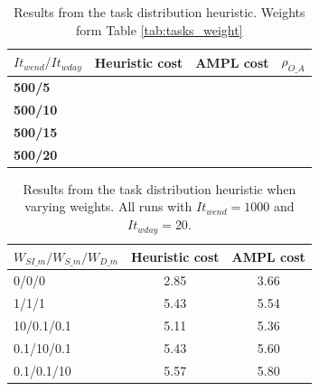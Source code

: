 \begin{table}[!h]
\centering
\label{tab:taskdist_res_new_2}
\caption{Results from the task distribution heuristic. Weights form Table \ref{tab:tasks_weight}}
\begin{tabular}{|l|l|l|l|}
\hline
\rowcolor{Gray} \textbf{$It_{wend}/It_{wday}$} &  \textbf{Heuristic cost} &  \textbf{AMPL cost} & \textbf{$\rho_{O\_A}$} \\ \hline
\cellcolor{Gray} \textbf{500/5} & \multicolumn{1}{c|}{} & \multicolumn{1}{c|}{} &  \\
\cellcolor{Gray} \textbf{500/10} & \multicolumn{1}{c|}{} & \multicolumn{1}{c|}{} &  \\
\cellcolor{Gray} \textbf{500/15} & \multicolumn{1}{c|}{} & \multicolumn{1}{c|}{} &  \\
\cellcolor{Gray} \textbf{500/20} & \multicolumn{1}{c|}{} & \multicolumn{1}{c|}{} &  \\
\hline
\end{tabular}
\end{table}

\begin{table}[!h]
\centering
\label{tab:taskdist_weights_res}
\caption{Results from the task distribution heuristic when varying weights. All runs with $It_{wend} = 1000$ and $It_{wday} = 20$.}
\begin{tabular}{|l|l|l|}
\hline
\rowcolor{Gray} \textbf{$W_{SI\_m}/W_{S\_m}/W_{D\_m}$} & \textbf{Heuristic cost} &  \textbf{AMPL cost} \\ \hline
\cellcolor{Gray} 0/0/0 & \multicolumn{1}{c|}{2.85} & \multicolumn{1}{c|}{3.66}  \\
\cellcolor{Gray} 1/1/1 & \multicolumn{1}{c|}{5.43} & \multicolumn{1}{c|}{5.54}  \\
\cellcolor{Gray} 10/0.1/0.1 & \multicolumn{1}{c|}{5.11} & \multicolumn{1}{c|}{5.36}  \\
\cellcolor{Gray} 0.1/10/0.1 & \multicolumn{1}{c|}{5.43} & \multicolumn{1}{c|}{5.60}  \\
\cellcolor{Gray} 0.1/0.1/10 & \multicolumn{1}{c|}{5.57} & \multicolumn{1}{c|}{5.80} \\
\hline
\end{tabular}
\end{table}


